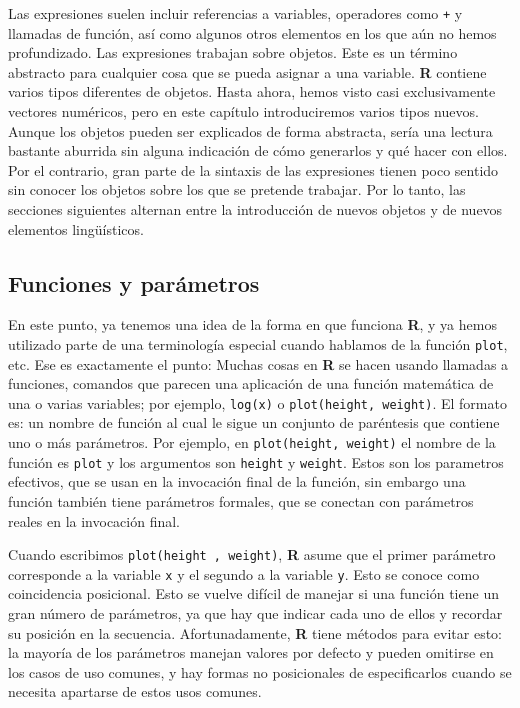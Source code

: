 
Las expresiones suelen incluir referencias a variables, operadores como
\texttt{+} y llamadas de función, así como algunos otros elementos en los que
aún no hemos profundizado.  Las expresiones trabajan sobre objetos. Este es un
término abstracto para cualquier cosa que se pueda asignar a una variable.
\textbf{R} contiene varios tipos diferentes de objetos. Hasta ahora, hemos
visto casi exclusivamente vectores numéricos, pero en este capítulo
introduciremos varios tipos nuevos.  Aunque los objetos pueden ser explicados
de forma abstracta, sería una lectura bastante aburrida sin alguna indicación
de cómo generarlos y qué hacer con ellos. Por el contrario, gran parte de la
sintaxis de las expresiones tienen poco sentido sin conocer los objetos sobre
los que se pretende trabajar. Por lo tanto, las secciones siguientes alternan
entre la introducción de nuevos objetos y de nuevos elementos lingüísticos.

\subsection{Funciones y parámetros}\label{funparams}

En este punto, ya tenemos una idea de la forma en que funciona \textbf{R}, y ya
hemos utilizado parte de una terminología especial cuando hablamos de la
función \texttt{plot}, etc. Ese es exactamente el punto: Muchas cosas en
\textbf{R} se hacen usando llamadas a funciones, comandos que parecen una
aplicación de una función matemática de una o varias variables; por ejemplo,
\texttt{log(x)} o \texttt{plot(height, weight)}. El formato es: un nombre de
función al cual le sigue un conjunto de paréntesis que contiene uno o más
parámetros. Por ejemplo, en \texttt{plot(height, weight)} el nombre de la
función es \texttt{plot} y los argumentos son \texttt{height} y
\texttt{weight}.  Estos son los parametros efectivos, que se usan en la
invocación final de la función, sin embargo una función también tiene
parámetros formales, que se conectan con parámetros reales en la invocación
final.

Cuando escribimos \texttt{plot(height , weight)}, \textbf{R} asume que el
primer parámetro corresponde a la variable \texttt{x} y el segundo a la
variable \texttt{y}. Esto se conoce como coincidencia posicional. Esto se
vuelve difícil de manejar si una función tiene un gran número de parámetros, ya
que hay que indicar cada uno de ellos y recordar su posición en la secuencia.
Afortunadamente, \textbf{R} tiene métodos para evitar esto: la mayoría de los
parámetros manejan valores por defecto y pueden omitirse en los casos de uso
comunes, y hay formas no posicionales de especificarlos cuando se necesita
apartarse de estos usos comunes.

